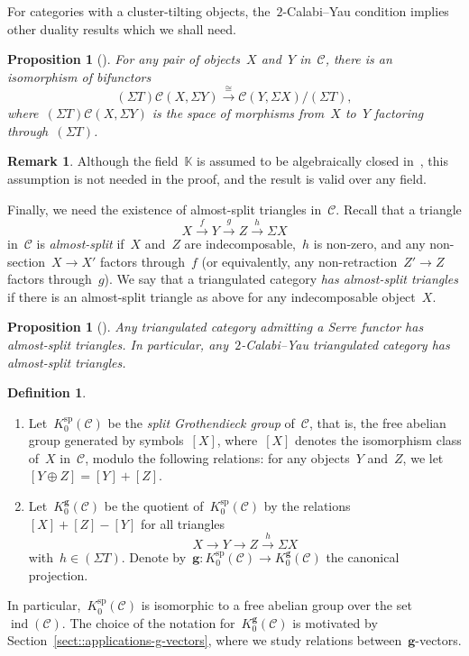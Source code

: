 \documentclass{amsart}
\newtheorem{proposition}[theorem]{Proposition}
\theoremstyle{definition}
\newtheorem{definition}[theorem]{Definition}
\newtheorem{remark}[theorem]{Remark}
\renewcommand{\b}[1]{{\boldsymbol{#1}}} %
\newcommand{\darkblue}{\color{darkblue}} %
\newcommand{\defn}[1]{\textsl{\darkblue #1}} %
\newcommand{\pg}[1]{\todo[color=green!30]{#1 \\ \hfill --- PG.}}
\newcommand{\field}{\mathbb{K}}
\newcommand{\cat}{\mathcal{C}}
\newcommand{\susp}{\Sigma}
\newcommand{\spl}{\operatorname{sp}}
\newcommand{\Ksp}{K_0^{\spl}}
\newcommand{\Kg}{K_0^{\b{g}}}
\newcommand{\ind}{\operatorname{ind}}
\begin{document}
For categories with a cluster-tilting objects, the~$2$-Calabi--Yau condition implies other duality results which we shall need.

\begin{proposition}[\cite{Palu}]
 For any pair of objects~$X$ and~$Y$ in~$\cat$, there is an isomorphism of bifunctors
 \[
  (\susp T)\cat(X, \susp Y) \xrightarrow{\cong} \cat(Y, \susp X)/(\susp T),
 \]
 where~$(\susp T)\cat(X, \susp Y)$ is the space of morphisms from~$X$ to~$Y$ factoring through~$(\susp T)$.
\end{proposition}

\begin{remark}
 Although the field~$\field$ is assumed to be algebraically closed in~\cite{Palu}, this assumption is not needed in the proof, and the result is valid over any field.
\end{remark}

Finally, we need the existence of almost-split triangles in~$\cat$.  Recall that a triangle
\[
 X\xrightarrow{f} Y \xrightarrow{g} Z \xrightarrow{h} \susp X
\]
in~$\cat$ is \defn{almost-split} if~$X$ and~$Z$ are indecomposable,~$h$ is non-zero, and any non-section~$X\to X'$ factors through~$f$  (or equivalently, any non-retraction~$Z'\to Z$ factors through~$g$).  We say that a triangulated category \defn{has almost-split triangles} if there is an almost-split triangle as above for any indecomposable object~$X$. 

\begin{proposition}[]\pg{Cite Happel}
 Any triangulated category admitting a Serre functor has almost-split triangles.  In particular, any~$2$-Calabi--Yau triangulated category has almost-split triangles.
\end{proposition}


\begin{definition}\label{defi::grothendieck-group}
 \begin{enumerate}
  \item Let~$\Ksp(\cat)$ be the \defn{split Grothendieck group} of~$\cat$, that is, the free abelian group generated by symbols~$[X]$, where~$[X]$ denotes the isomorphism class of~$X$ in~$\cat$, modulo the following relations: for any objects~$Y$ and~$Z$, we let~$[Y\oplus Z] = [Y] + [Z]$. 
  
  \item Let~$\Kg(\cat)$ be the quotient of~$\Ksp(\cat)$ by the relations~$[X]+[Z]-[Y]$ for all triangles
  \[
   X\xrightarrow{} Y \xrightarrow{} Z \xrightarrow{h} \susp X
  \]
  with~$h\in (\susp T)$.  Denote by~$\b g:\Ksp(\cat) \to \Kg(\cat)$ the canonical projection.

 \end{enumerate}

 
\end{definition}
In particular,~$\Ksp(\cat)$ is isomorphic to a free abelian group over the set~$\ind(\cat)$.  The choice of the notation for~$\Kg(\cat)$ is motivated by Section~\ref{sect::applications-g-vectors}, where we study relations between~$\b g$-vectors.
\end{document}
